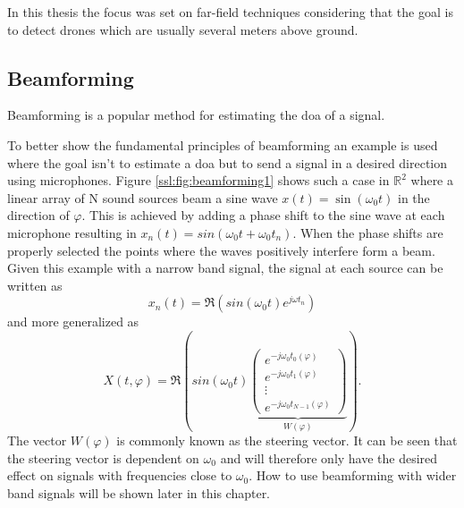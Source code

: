 In this thesis the focus was set on far-field techniques considering that the
goal is to detect drones which are usually several meters above ground.

\subsection{Beamforming}
Beamforming is a popular method for estimating the \acrshort{doa} of a signal.

To better show the fundamental principles of beamforming an example is used
where the goal isn't to estimate a \acrshort{doa} but to send a signal
in a desired direction using microphones.
Figure \ref{ssl:fig:beamforming1} shows such a case in $\mathbb{R}^2$
where a linear array of N sound sources beam a sine wave $x(t) = \sin(\omega_0 t)$ 
in the direction of $\varphi$.
This is achieved by adding a phase shift to the sine wave
at each microphone resulting in $x_n(t) = sin(\omega_0 t + \omega_0t_n)$.
When the phase shifts are properly selected the points where the waves positively
interfere form a beam.
Given this example with a narrow band signal, the signal at each source
can be written as
\begin{equation}
	x_n(t) = \Re(sin(\omega_0 t) e^{j\omega t_n})
\end{equation}
and more generalized as 
\begin{equation}
  \label{ssl:eq:beamSteerOut}
  X(t, \varphi) = 
  \Re\left(
    sin(\omega_0 t)
    \underbrace{
      \begin{pmatrix} 
        e^{-j\omega_0 t_0(\varphi)} \\ 
        e^{-j\omega_0 t_1(\varphi)} \\
        \vdots \\ 
        e^{-j\omega_0 t_{N-1}(\varphi)} 
      \end{pmatrix}}_{W(\varphi)}
  \right).
\end{equation}
The vector $W(\varphi)$ is commonly known as the steering vector.
It can be seen that the steering vector is dependent on $\omega_0$ and 
will therefore only have the desired effect on signals with frequencies 
close to $\omega_0$.
How to use beamforming with wider band signals will be shown later in this chapter.
